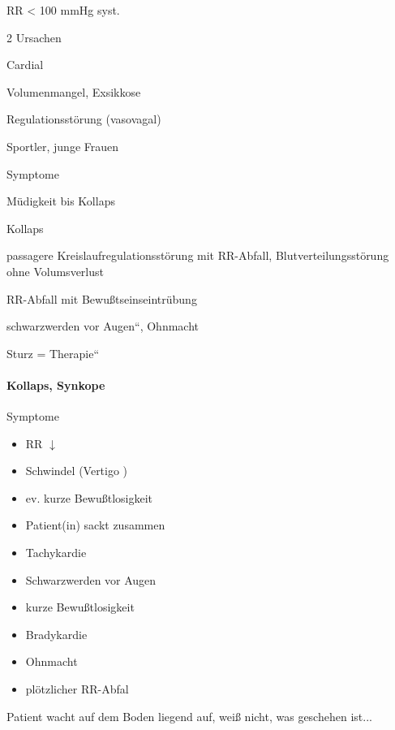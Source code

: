 \documentclass{article}
\begin{document}
RR {\textless} 100 mmHg syst.

\begin{multicols}{2}
Ursachen

Cardial

Volumenmangel, Exsikkose

Regulationsst\"orung (vasovagal)

Sportler, junge Frauen

Symptome

M\"udigkeit bis Kollaps

Kollaps

passagere Kreislaufregulationsst\"orung  mit RR-Abfall,
Blutverteilungsst\"orung  ohne Volumsverlust

RR-Abfall mit Bewu{\ss}tseinseintr\"ubung

{\quotedblbase}schwarzwerden vor Augen{\textquotedblleft}, Ohnmacht

Sturz = {\quotedblbase}Therapie{\textquotedblleft}

\end{multicols}
\paragraph{Kollaps, Synkope}
Symptome

\begin{itemize}
\item RR ${\downarrow}$

\item Schwindel (Vertigo )

\item ev. kurze Bewu{\ss}tlosigkeit

\item Patient(in) sackt zusammen

\item Tachykardie

\item Schwarzwerden vor Augen

\item kurze Bewu{\ss}tlosigkeit

\item Bradykardie

\item Ohnmacht

\item pl\"otzlicher RR-Abfal

\end{itemize}
Patient wacht auf dem Boden liegend  auf, wei{\ss} nicht, was geschehen
ist...
\end{document}
